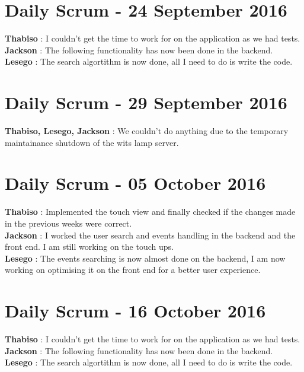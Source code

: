 \documentclass[10pt,a4paper]{article}
\begin{document}
\section{Daily Scrum - 24 September 2016}
\textbf{Thabiso} : I couldn't get the time to work for on the application as we had tests.\\

\textbf{Jackson} : The following functionality has now been done in the backend.\\

\textbf{Lesego} : The search algortithm is now done, all I need to do is write the code.\\
\section{Daily Scrum - 29 September 2016}
\textbf{Thabiso, Lesego, Jackson} : We couldn't do anything due to the temporary maintainance shutdown of the wits lamp server.\\

\section{Daily Scrum - 05 October 2016}
\textbf{Thabiso} : Implemented the touch view and finally checked if the changes made in the previous weeks were correct.\\

\textbf{Jackson} : I worked the user search and events handling in the backend and the front end. I am  still working on the touch ups.\\

\textbf{Lesego} : The events searching is now almost done on the backend, I am now working on optimising it on the front end for a better 
user experience.\\

\section{Daily Scrum - 16 October 2016}
\textbf{Thabiso} : I couldn't get the time to work for on the application as we had tests.\\

\textbf{Jackson} : The following functionality has now been done in the backend.\\

\textbf{Lesego} : The search algortithm is now done, all I need to do is write the code.\\
\end{document}
